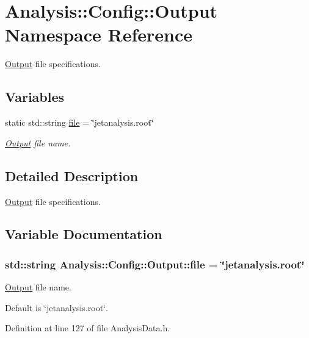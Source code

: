 \hypertarget{namespaceAnalysis_1_1Config_1_1Output}{}\section{Analysis\+:\+:Config\+:\+:Output Namespace Reference}
\label{namespaceAnalysis_1_1Config_1_1Output}


\hyperlink{namespaceAnalysis_1_1Config_1_1Output}{Output} file specifications.  


\subsection*{Variables}
\begin{DoxyCompactItemize}
\item 
static std\+::string \hyperlink{namespaceAnalysis_1_1Config_1_1Output_a29f1fb8da8e579fa6db674009ae8ed44}{file} = \char`\"{}jetanalysis.\+root\char`\"{}
\begin{DoxyCompactList}\small\item\em \hyperlink{namespaceAnalysis_1_1Config_1_1Output}{Output} file name. \end{DoxyCompactList}\end{DoxyCompactItemize}


\subsection{Detailed Description}
\hyperlink{namespaceAnalysis_1_1Config_1_1Output}{Output} file specifications. 

\subsection{Variable Documentation}
\subsubsection[{\texorpdfstring{file}{file}}]{\setlength{\rightskip}{0pt plus 5cm}std\+::string Analysis\+::\+Config\+::\+Output\+::file = \char`\"{}jetanalysis.\+root\char`\"{}\hspace{0.3cm}{\ttfamily [static]}}\hypertarget{namespaceAnalysis_1_1Config_1_1Output_a29f1fb8da8e579fa6db674009ae8ed44}{}\label{namespaceAnalysis_1_1Config_1_1Output_a29f1fb8da8e579fa6db674009ae8ed44}


\hyperlink{namespaceAnalysis_1_1Config_1_1Output}{Output} file name. 

Default is \char`\"{}jetanalysis.\+root\char`\"{}. 

Definition at line 127 of file Analysis\+Data.\+h.

